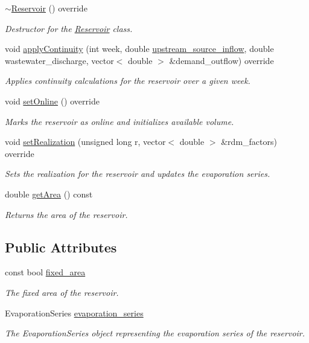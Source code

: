 \begin{DoxyCompactItemize}
\mbox{\hyperlink{classReservoir_a2f8bfdc73c7470185775a940fb3531de}{$\sim$\+Reservoir}} () override
\begin{DoxyCompactList}\small\item\em Destructor for the \mbox{\hyperlink{classReservoir}{Reservoir}} class. \end{DoxyCompactList}\item 
void \mbox{\hyperlink{classReservoir_a66929c055193785bc9d47bcdf0bc7445}{apply\+Continuity}} (int week, double \mbox{\hyperlink{classWaterSource_a7a69b2e9b6030f1035e6cf44d2918ee5}{upstream\+\_\+source\+\_\+inflow}}, double wastewater\+\_\+discharge, vector$<$ double $>$ \&demand\+\_\+outflow) override
\begin{DoxyCompactList}\small\item\em Applies continuity calculations for the reservoir over a given week. \end{DoxyCompactList}\item 
void \mbox{\hyperlink{classReservoir_ac6f64dd92c401e58095e7b125855041b}{set\+Online}} () override
\begin{DoxyCompactList}\small\item\em Marks the reservoir as online and initializes available volume. \end{DoxyCompactList}\item 
void \mbox{\hyperlink{classReservoir_ad1bb7aa46397719d09e0b6188b9bc28d}{set\+Realization}} (unsigned long r, vector$<$ double $>$ \&rdm\+\_\+factors) override
\begin{DoxyCompactList}\small\item\em Sets the realization for the reservoir and updates the evaporation series. \end{DoxyCompactList}\item 
double \mbox{\hyperlink{classReservoir_af86ffdaa2842a38b7f59e0360a1004a1}{get\+Area}} () const
\begin{DoxyCompactList}\small\item\em Returns the area of the reservoir. \end{DoxyCompactList}\end{DoxyCompactItemize}
\subsection*{Public Attributes}
\begin{DoxyCompactItemize}
\item 
const bool \mbox{\hyperlink{classReservoir_ad4b37aef4873071d1766baaccce5b8cf}{fixed\+\_\+area}}
\begin{DoxyCompactList}\small\item\em The fixed area of the reservoir. \end{DoxyCompactList}\item 
Evaporation\+Series \mbox{\hyperlink{classReservoir_a2d2d9b302c13703309bb798d24136810}{evaporation\+\_\+series}}
\begin{DoxyCompactList}\small\item\em The Evaporation\+Series object representing the evaporation series of the reservoir. \end{DoxyCompactList}\end{DoxyCompactItemize}
